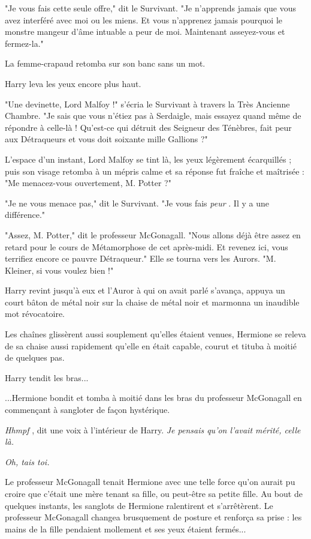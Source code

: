 "Je vous fais cette seule offre," dit le Survivant. "Je n'apprends jamais que vous avez interféré avec moi ou les miens. Et vous n'apprenez jamais pourquoi le monstre mangeur d'âme intuable a peur de moi. Maintenant asseyez-vous et fermez-la."

La femme-crapaud retomba sur son banc sans un mot.

Harry leva les yeux encore plus haut.

"Une devinette, Lord Malfoy !" s'écria le Survivant à travers la Très Ancienne Chambre. "Je sais que vous n'étiez pas à Serdaigle, mais essayez quand même de répondre à celle-là ! Qu'est-ce qui détruit des Seigneur des Ténèbres, fait peur aux Détraqueurs et vous doit soixante mille Gallions ?"

L'espace d'un instant, Lord Malfoy se tint là, les yeux légèrement écarquillés ; puis son visage retomba à un mépris calme et sa réponse fut fraîche et maîtrisée : "Me menacez-vous ouvertement, M. Potter ?"

"Je ne vous menace pas," dit le Survivant. "Je vous fais \emph{peur} . Il y a une différence."

"Assez, M. Potter," dit le professeur McGonagall. "Nous allons déjà être assez en retard pour le cours de Métamorphose de cet après-midi. Et revenez ici, vous terrifiez encore ce pauvre Détraqueur." Elle se tourna vers les Aurors. "M. Kleiner, si vous voulez bien !"

Harry revint jusqu'à eux et l'Auror à qui on avait parlé s'avança, appuya un court bâton de métal noir sur la chaise de métal noir et marmonna un inaudible mot révocatoire.

Les chaînes glissèrent aussi souplement qu'elles étaient venues, Hermione se releva de sa chaise aussi rapidement qu'elle en était capable, courut et tituba à moitié de quelques pas.

Harry tendit les bras...

...Hermione bondit et tomba à moitié dans les bras du professeur McGonagall en commençant à sangloter de façon hystérique.

\emph{Hhmpf} , dit une voix à l'intérieur de Harry. \emph{Je pensais qu'on l'avait mérité, celle là.} 

\emph{Oh, tais toi.} 

Le professeur McGonagall tenait Hermione avec une telle force qu'on aurait pu croire que c'était une mère tenant sa fille, ou peut-être sa petite fille. Au bout de quelques instants, les sanglots de Hermione ralentirent et s'arrêtèrent. Le professeur McGonagall changea brusquement de posture et renforça sa prise : les mains de la fille pendaient mollement et ses yeux étaient fermés...

